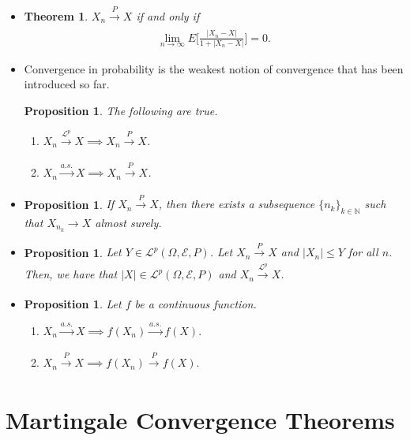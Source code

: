 \documentclass[10pt]{article}
\newtheorem{theorem}[lemma]{Theorem}
\newtheorem{proposition}[lemma]{Proposition}
\numberwithin{lemma}{section}
\newcommand{\mcal}[1]{\mathcal{#1}}
\newcommand{\Nat}{\mathbb{N}}
\begin{document}
\begin{itemize}
  \item \begin{theorem}
    $X_n \xrightarrow[]{P} X$ if and only if
    \begin{align*}
      \lim_{n \rightarrow \infty} E\bigg[ \frac{|X_n - X|}{1 + |X_n - X|} \bigg] = 0.
    \end{align*}
  \end{theorem}

  \item Convergence in probability is the weakest notion of convergence that has been introduced so far.
  \begin{proposition}
    The following are true.
    \begin{enumerate}
      \item $X_n \xrightarrow[]{\mcal{L}^p} X \implies X_n \xrightarrow[]{P} X$.
      \item $X_n \xrightarrow[]{a.s.} X \implies X_n \xrightarrow[]{P} X$.
    \end{enumerate}
  \end{proposition}

  \item \begin{proposition}
    If $X_n \xrightarrow[]{P} X$, then there exists a subsequence $\{ n_k \}_{k \in \Nat}$ such that $X_{n_k} \rightarrow X$ almost surely.
  \end{proposition}

  \item \begin{proposition}
    Let $Y \in \mcal{L}^p(\Omega, \mcal{E},P)$. Let $X_n \xrightarrow[]{P} X$ and $|X_n| \leq Y$ for all $n$. Then, we have that $|X| \in \mcal{L}^p(\Omega, \mcal{E},P)$ and $X_n \xrightarrow[]{\mcal{L}^p} X$.
  \end{proposition}

  \item \begin{proposition}
    Let $f$ be a continuous function.
    \begin{enumerate}
      \item $X_n \xrightarrow[]{a.s.} X \implies f(X_n) \xrightarrow[]{a.s.} f(X).$
      \item $X_n \xrightarrow[]{P} X \implies f(X_n) \xrightarrow[]{P} f(X).$
    \end{enumerate}
  \end{proposition}
\end{itemize}

\section{Martingale Convergence Theorems}
\end{document}
